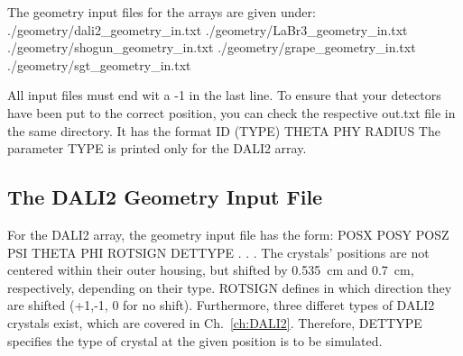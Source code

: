 \documentclass[12pt]{book}
\begin{document}
The geometry input files for the arrays are given under:\hfill{} 
\linebreak
\linebreak
{\ttfamily ./geometry/dali2\_geometry\_in.txt}\linebreak
{\ttfamily ./geometry/LaBr3\_geometry\_in.txt}\linebreak
{\ttfamily ./geometry/shogun\_geometry\_in.txt}\linebreak
{\ttfamily ./geometry/grape\_geometry\_in.txt}\linebreak
{\ttfamily ./geometry/sgt\_geometry\_in.txt}\linebreak
\linebreak
\linebreak

All input files must end wit a -1 in the last line.
To ensure that your detectors have been put to the correct position, you can check the respective 
{\ttfamily *out.txt} file in the same directory. It has the format 
\linebreak
\linebreak
{\ttfamily ID (TYPE) THETA PHY RADIUS }\linebreak
\linebreak
\linebreak
The parameter {\ttfamily TYPE} is printed only for the DALI2 array.

\subsection{The DALI2 Geometry Input File}

For the DALI2 array, the geometry input file has the form:\hfill{} 
\linebreak
\linebreak
{\ttfamily POSX POSY POSZ PSI THETA PHI ROTSIGN DETTYPE}\linebreak
{\ttfamily .}\linebreak
{\ttfamily .}\linebreak
{\ttfamily .}\linebreak
\linebreak
\linebreak
The crystals' positions are not centered within their outer housing, but shifted by 0.535~cm and 0.7~cm, respectively,
depending on their type. 
{\ttfamily ROTSIGN} defines in which direction they are shifted (+1,-1, 0 for no shift). Furthermore, three differet
types of DALI2 crystals exist, which are covered in Ch.~\ref{ch:DALI2}. Therefore, {\ttfamily DETTYPE} specifies
the type of crystal at the given position is to be simulated.
\end{document}
